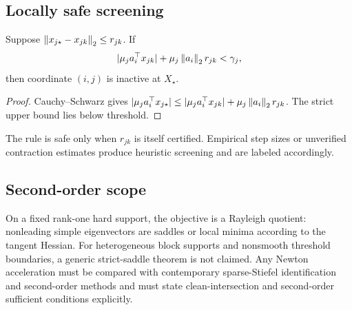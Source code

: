 \subsection{Locally safe screening}
\begin{proposition}
\label{prop:safe-screen}
Suppose \(\left\lVert x_{j\star}-x_{jk} \right\rVert_2\le r_{jk}\). If
\[
|\mu_j a_i^\top x_{jk}|+\mu_j\left\lVert a_i \right\rVert_2 r_{jk}<\gamma_j,
\]
then coordinate \((i,j)\) is inactive at \(X_\star\).
\end{proposition}
\begin{proof}
Cauchy--Schwarz gives \(|\mu_j a_i^\top x_{j\star}|\le |\mu_j a_i^\top x_{jk}|+\mu_j\left\lVert a_i \right\rVert_2r_{jk}\). The strict upper bound lies below threshold.
\end{proof}
The rule is safe only when \(r_{jk}\) is itself certified. Empirical step sizes or unverified contraction estimates produce heuristic screening and are labeled accordingly.

\subsection{Second-order scope}
On a fixed rank-one hard support, the objective is a Rayleigh quotient: nonleading simple eigenvectors are saddles or local minima according to the tangent Hessian. For heterogeneous block supports and nonsmooth threshold boundaries, a generic strict-saddle theorem is not claimed. Any Newton acceleration must be compared with contemporary sparse-Stiefel identification and second-order methods and must state clean-intersection and second-order sufficient conditions explicitly.
